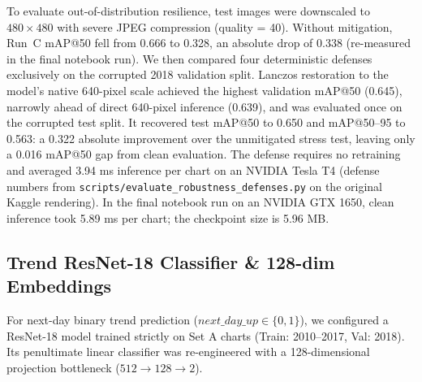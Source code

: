 \documentclass[10pt,journal]{IEEEtran}
\begin{document}
To evaluate out-of-distribution resilience, test images were downscaled to $480\times480$ with severe JPEG compression (quality = 40). Without mitigation, Run~C mAP@50 fell from 0.666 to 0.328, an absolute drop of 0.338 (re-measured in the final notebook run). We then compared four deterministic defenses exclusively on the corrupted 2018 validation split. Lanczos restoration to the model's native 640-pixel scale achieved the highest validation mAP@50 (0.645), narrowly ahead of direct 640-pixel inference (0.639), and was evaluated once on the corrupted test split. It recovered test mAP@50 to 0.650 and mAP@50--95 to 0.563: a 0.322 absolute improvement over the unmitigated stress test, leaving only a 0.016 mAP@50 gap from clean evaluation. The defense requires no retraining and averaged 3.94 ms inference per chart on an NVIDIA Tesla T4 (defense numbers from \texttt{scripts/evaluate\_robustness\_defenses.py} on the original Kaggle rendering). In the final notebook run on an NVIDIA GTX 1650, clean inference took 5.89 ms per chart; the checkpoint size is 5.96 MB.

\subsection{Trend ResNet-18 Classifier \& 128-dim Embeddings}
For next-day binary trend prediction ($next\_day\_up \in \{0, 1\}$), we configured a ResNet-18 model trained strictly on Set A charts (Train: 2010--2017, Val: 2018). Its penultimate linear classifier was re-engineered with a 128-dimensional projection bottleneck ($512 \rightarrow 128 \rightarrow 2$).

\begin{table}[htbp]
\centering
\caption{Next-Day Direction Trend Prediction on Test Split (2019--2020)}
\label{tab:trend_results}
\end{table}
\end{document}
